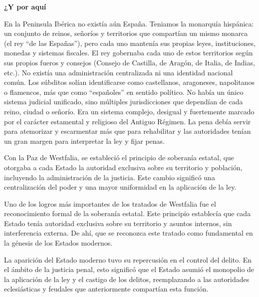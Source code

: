\documentclass[
  spanish,
  letterpaper,
  DIV=11,
  numbers=noendperiod]{scrreprt}
\begin{document}
\begin{tcolorbox}[enhanced jigsaw, bottomtitle=1mm, toprule=.15mm, colbacktitle=quarto-callout-note-color!10!white, bottomrule=.15mm, leftrule=.75mm, colframe=quarto-callout-note-color-frame, opacitybacktitle=0.6, titlerule=0mm, breakable, colback=white, left=2mm, arc=.35mm, title=\textcolor{quarto-callout-note-color}{\faInfo}\hspace{0.5em}{Nota}, toptitle=1mm, coltitle=black, rightrule=.15mm, opacityback=0]

\textbf{¿Y por aquí}

En la Peninsula Ibérica no existía aún España. Teniamos la monarquía
hispánica: un conjunto de reinos, señoríos y territorios que compartían
un mismo monarca (el rey ``de las Españas''), pero cada uno mantenía sus
propias leyes, instituciones, monedas y sistemas fiscales. El rey
gobernaba cada uno de estos territorios según sus propios fueros y
consejos (Consejo de Castilla, de Aragón, de Italia, de Indias, etc.).
No existía una administración centralizada ni una identidad nacional
común. Los súbditos solían identificarse como castellanos, aragoneses,
napolitanos o flamencos, más que como ``españoles'' en sentido político.
No había un único sistema judicial unificado, sino múltiples
jurisdicciones que dependían de cada reino, ciudad o señorío. Era un
sistema complejo, desigual y fuertemente marcado por el carácter
estamental y religioso del Antiguo Régimen. La pena debía servir para
atemorizar y escarmentar más que para rehabilitar y las autoridades
tenían un gran margen para interpretar la ley y fijar penas.

\end{tcolorbox}

Con la Paz de Westfalia, se estableció el principio de soberanía
estatal, que otorgaba a cada Estado la autoridad exclusiva sobre su
territorio y población, incluyendo la administración de la justicia.
Este cambio significó una centralización del poder y una mayor
uniformidad en la aplicación de la ley.

Uno de los logros más importantes de los tratados de Westfalia fue el
reconocimiento formal de la soberanía estatal. Este principio establecía
que cada Estado tenía autoridad exclusiva sobre su territorio y asuntos
internos, sin interferencia externa. De ahí, que se reconozca este
tratado como fundamental en la génesis de los Estados modernos.

La aparición del Estado moderno tuvo su repercusión en el control del
delito. En el ámbito de la justicia penal, esto significó que el Estado
asumió el monopolio de la aplicación de la ley y el castigo de los
delitos, reemplazando a las autoridades eclesiásticas y feudales que
anteriormente compartían esta función.
\end{document}

